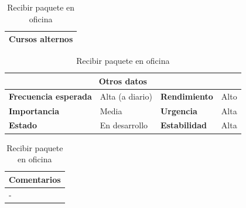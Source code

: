 \documentclass[12pt,spanish]{article}
\begin{document}
\begin{table}[H]
\vspace{1cm}

\begin{tabular}{|m{10pt}|m{7.15cm}|m{10pt}|m{7.15cm}|}
\hline
\multicolumn{4}{|m{16.2cm}|}{\textbf{Cursos alternos}} \\
\hline
\end{tabular}

\vspace{1cm}

\begin{tabular}{|m{3.72cm}|m{3.72cm}|m{3.72cm}|m{3.72cm}|}
\hline
\multicolumn{4}{|c|}{\textbf{Otros datos}} \\
\hline
\textbf{Frecuencia esperada} & Alta (a diario) & \textbf{Rendimiento} & Alto \\
\hline
\textbf{Importancia} & Media & \textbf{Urgencia} & Alta \\
\hline
\textbf{Estado} & En desarrollo & \textbf{Estabilidad} & Alta \\
\hline
\end{tabular}

\vspace{1cm}

\begin{tabular}{|m{16.2cm}|}
\hline
\textbf{Comentarios} \\
\hline
- \\
\hline
\end{tabular}

\caption{Recibir paquete en oficina}

\end{table}



\end{document}
